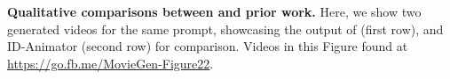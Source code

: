 
\begin{center}
    \centering
    \captionsetup{type=figure}
    
    \vspace{-3mm}

    \caption{\textbf{Qualitative comparisons between \OursPTV and prior work.}
    Here, we show two generated videos for the same prompt, showcasing the output of \OursPTV (first row), and ID-Animator (second row) for comparison. 
    Videos in this Figure found at \url{https://go.fb.me/MovieGen-Figure22}.
    }

    \label{fig:pt2v_qual_ida_vs_ours_figure}
\end{center}%
